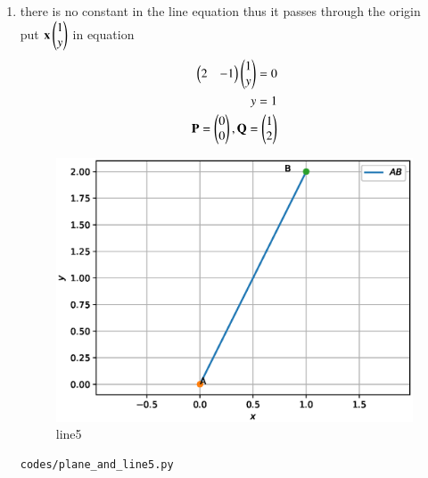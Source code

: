 \begin{enumerate}[label=\arabic*.,ref=\thesubsection.\theenumi]
\begin{enumerate}
\item there is no constant in the line equation thus it passes through the origin
\\
put $\mathbf x \begin{pmatrix}1\\y\end{pmatrix}$ in equation
\\
\begin{align}
\begin{pmatrix}2 & -1\end{pmatrix}\begin{pmatrix}1\\y\end{pmatrix} = 0
\\
y= 1
\\
\mathbf{P} = \begin{pmatrix}0\\0\end{pmatrix}, \mathbf{Q} = \begin{pmatrix}1\\2\end{pmatrix}
\end{align}
\begin{figure}[!ht]
	\centering
	\includegraphics[width=\columnwidth]{./figures/plane_and_line5.eps}
	\caption{line5 }
	\label{fig:line5}
\end{figure}
\begin{lstlisting}
codes/plane_and_line5.py
\end{lstlisting}




\end{enumerate}
\end{enumerate}
